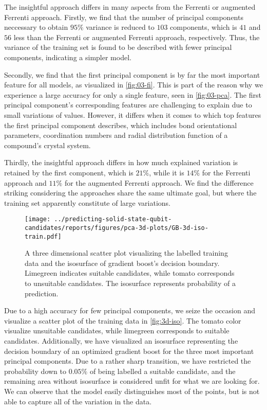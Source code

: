 The insightful approach differs in many aspects from the Ferrenti or augmented Ferrenti approach. Firstly, we find that the number of principal components neccessary to obtain $95\%$ variance is reduced to $103$ components, which is $41$ and $56$ less than the Ferrenti or augmented Ferrenti approach, respectively. Thus, the variance of the training set is found to be described with fewer principal components, indicating a simpler model.

Secondly, we find that the first principal component is by far the most important feature for all models, as visualized in \autoref{fig:03-fi}. This is part of the reason why we experience a large accuracy for only a single feature, seen in \autoref{fig:03-pca}. The first principal component's corresponding features are challenging to explain due to small variations of values. However, it differs when it comes to which top features the first principal component describes, which includes bond orientational parameters, coordination numbers and radial distribution function of a compound's crystal system.

Thirdly, the insightful approach differs in how much explained variation is retained by the first component, which is $21\%$, while it is $14\%$ for the Ferrenti approach and $11\%$ for the augmented Ferrenti approach. We find the difference striking considering the approaches share the same ultimate goal, but where the training set apparently constitute of large variations.

\begin{figure}[h!]
    \centering
    \texttt{[image: ../predicting-solid-state-qubit-candidates/reports/figures/pca-3d-plots/GB-3d-iso-train.pdf]}
  \vspace*{-140mm}
  \caption{A three dimensional scatter plot visualizing the labelled training data and the isosurface of gradient boost's decision boundary. Limegreen indicates suitable candidates, while tomato corresponds to unsuitable candidates. The isosurface represents probability of a prediction.}
  \label{fig:3d-iso}
\end{figure}

Due to a high accuracy for few principal components, we seize the occasion and visualize a scatter plot of the training data in \autoref{fig:3d-iso}. The tomato color visualize unsuitable candidates, while limegreen corresponds to suitable candidates. Additionally, we have visualized an isosurface representing the decision boundary of an optimized gradient boost for the three most important principal components. Due to a rather sharp transition, we have restricted the probability down to $0.05\%$ of being labelled a suitable candidate, and the remaining area without isosurface is considered unfit for what we are looking for. We can observe that the model easily distinguishes most of the points, but is not able to capture all of the variation in the data.

